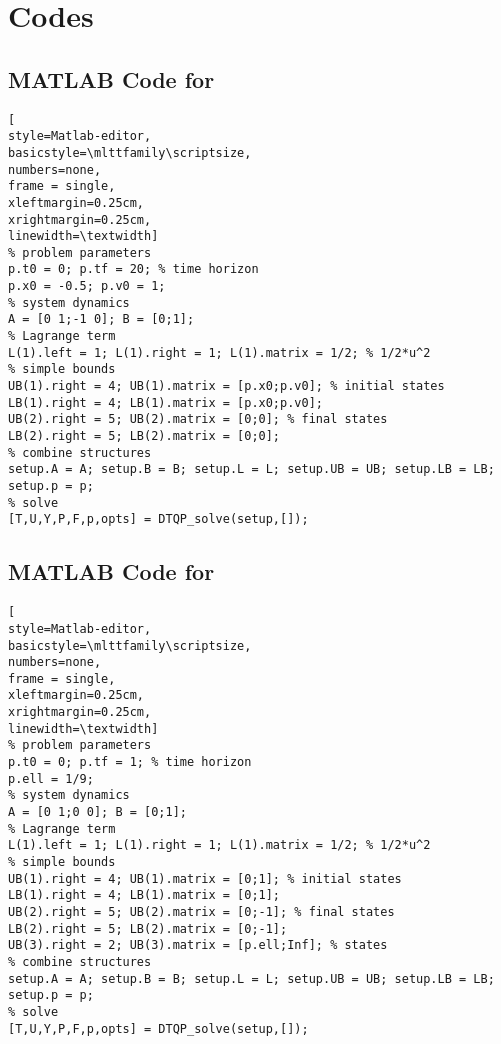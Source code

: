 \section{Codes} \label{sec:ch5:codes}

\subsection{MATLAB Code for } \label{sec:ex1-code}

\begin{lstlisting}[
style=Matlab-editor,
basicstyle=\mlttfamily\scriptsize,
numbers=none,
frame = single, 
xleftmargin=0.25cm,
xrightmargin=0.25cm,
linewidth=\textwidth]
% problem parameters
p.t0 = 0; p.tf = 20; % time horizon
p.x0 = -0.5; p.v0 = 1;
% system dynamics
A = [0 1;-1 0]; B = [0;1]; 
% Lagrange term
L(1).left = 1; L(1).right = 1; L(1).matrix = 1/2; % 1/2*u^2
% simple bounds
UB(1).right = 4; UB(1).matrix = [p.x0;p.v0]; % initial states
LB(1).right = 4; LB(1).matrix = [p.x0;p.v0];
UB(2).right = 5; UB(2).matrix = [0;0]; % final states
LB(2).right = 5; LB(2).matrix = [0;0];
% combine structures
setup.A = A; setup.B = B; setup.L = L; setup.UB = UB; setup.LB = LB; setup.p = p;
% solve
[T,U,Y,P,F,p,opts] = DTQP_solve(setup,[]);
\end{lstlisting}

\subsection{MATLAB Code for } \label{sec:ex2-code}

\begin{lstlisting}[
style=Matlab-editor,
basicstyle=\mlttfamily\scriptsize,
numbers=none,
frame = single, 
xleftmargin=0.25cm,
xrightmargin=0.25cm,
linewidth=\textwidth]
% problem parameters
p.t0 = 0; p.tf = 1; % time horizon
p.ell = 1/9;
% system dynamics
A = [0 1;0 0]; B = [0;1]; 
% Lagrange term
L(1).left = 1; L(1).right = 1; L(1).matrix = 1/2; % 1/2*u^2
% simple bounds
UB(1).right = 4; UB(1).matrix = [0;1]; % initial states
LB(1).right = 4; LB(1).matrix = [0;1];
UB(2).right = 5; UB(2).matrix = [0;-1]; % final states
LB(2).right = 5; LB(2).matrix = [0;-1];
UB(3).right = 2; UB(3).matrix = [p.ell;Inf]; % states
% combine structures
setup.A = A; setup.B = B; setup.L = L; setup.UB = UB; setup.LB = LB; setup.p = p;
% solve
[T,U,Y,P,F,p,opts] = DTQP_solve(setup,[]);
\end{lstlisting}

\newpage

